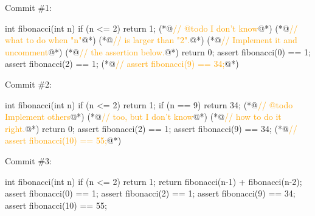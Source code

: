 \documentclass{article}
\begin{document}
\begin{pptWide}{3}
Commit \#1:\par
{\scriptsize\begin{ffcode}
int fibonacci(int n) {
  if (n <= 2) {
    return 1;
  }
  (*@\textcolor{orange}{// @todo I don't know}@*)
  (*@\textcolor{orange}{// what to do when "n"}@*)
  (*@\textcolor{orange}{// is larger than "2".}@*)
  (*@\textcolor{orange}{// Implement it and uncomment}@*)
  (*@\textcolor{orange}{// the assertion below.}@*)
  return 0;
}
assert fibonacci(0) == 1;
assert fibonacci(2) == 1;
(*@\textcolor{orange}{// assert fibonacci(9) == 34;}@*)
\end{ffcode}
}
\par\columnbreak\par
Commit \#2:\par
{\scriptsize\begin{ffcode}
int fibonacci(int n) {
  if (n <= 2) {
    return 1;
  }
  if (n == 9) {
    return 34;
  }
  (*@\textcolor{orange}{// @todo Implement others}@*)
  (*@\textcolor{orange}{// too, but I don't know}@*)
  (*@\textcolor{orange}{// how to do it right.}@*)
  return 0;
}
assert fibonacci(2) == 1;
assert fibonacci(9) == 34;
(*@\textcolor{orange}{// assert fibonacci(10) == 55;}@*)
\end{ffcode}
}
\par\columnbreak\par
Commit \#3:\par
{\scriptsize\begin{ffcode}
int fibonacci(int n) {
  if (n <= 2) {
    return 1;
  }
  return fibonacci(n-1)
    + fibonacci(n-2);
}
assert fibonacci(0) == 1;
assert fibonacci(2) == 1;
assert fibonacci(9) == 34;
assert fibonacci(10) == 55;
\end{ffcode}
}
\end{pptWide}
\plush{}

\end{document}
